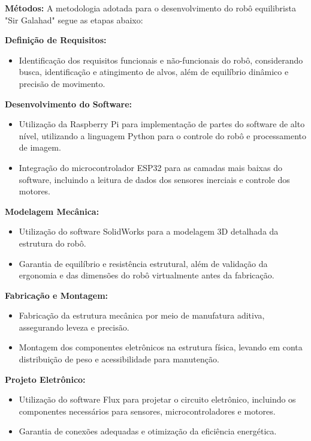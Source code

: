 \textbf{Métodos:} A metodologia adotada para o desenvolvimento do robô equilibrista "Sir Galahad" segue as etapas abaixo:

\textbf{Definição de Requisitos:}
\begin{itemize}
   \item  Identificação dos requisitos funcionais e não-funcionais do robô, considerando busca, identificação e atingimento de alvos, além de equilíbrio dinâmico e precisão de movimento.
\end{itemize}

\textbf{Desenvolvimento do Software:}
\begin{itemize}
   \item Utilização da Raspberry Pi para implementação de partes do software de alto nível, utilizando a linguagem Python para o controle do robô e processamento de imagem.
   \item Integração do microcontrolador ESP32 para as camadas mais baixas do software, incluindo a leitura de dados dos sensores inerciais e controle dos motores.
\end{itemize}

\textbf{Modelagem Mecânica:}
\begin{itemize}
   \item Utilização do software SolidWorks para a modelagem 3D detalhada da estrutura do robô.
   \item Garantia de equilíbrio e resistência estrutural, além de validação da ergonomia e das dimensões do robô virtualmente antes da fabricação.
\end{itemize}

\textbf{Fabricação e Montagem:}
\begin{itemize}
   \item Fabricação da estrutura mecânica por meio de manufatura aditiva, assegurando leveza e precisão.
   \item Montagem dos componentes eletrônicos na estrutura física, levando em conta distribuição de peso e acessibilidade para manutenção.
\end{itemize}

\textbf{Projeto Eletrônico:}
\begin{itemize}
   \item Utilização do software Flux para projetar o circuito eletrônico, incluindo os componentes necessários para sensores, microcontroladores e motores.
   \item Garantia de conexões adequadas e otimização da eficiência energética.
\end{itemize}

